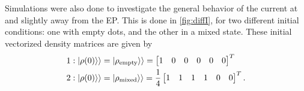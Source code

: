 \documentclass[../main.tex]{subfiles}
\begin{document}
Simulations were also done to investigate the general behavior of the current at and slightly away from the EP. This is done in \cref{fig:diffI}, for two different initial conditions: one with empty dots, and the other in a mixed state. These initial vectorized density matrices are given by
\begin{equation}\label{eq:initialI}
\begin{split}
    1: \ket{\rho(0)}\rangle &= \ket{\rho_\text{empty}}\rangle = \begin{bmatrix} 1 & 0 & 0 & 0 & 0 & 0 \end{bmatrix}^T\\
    2: \ket{\rho(0)}\rangle &= \ket{\rho_\text{mixed}}\rangle = \frac{1}{4}\begin{bmatrix} 1 & 1 & 1 & 1 & 0 & 0\end{bmatrix}^T.
\end{split}
\end{equation}
\end{document}
